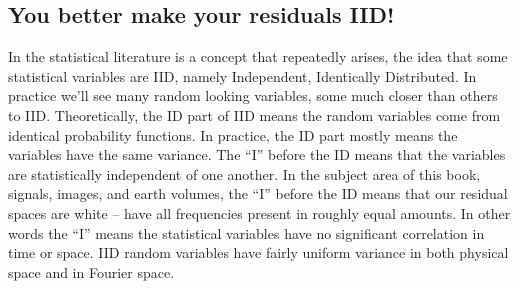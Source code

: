 \subsection{You better make your residuals IID!}
In the statistical literature is a concept that repeatedly arises,
the idea that some statistical variables are IID, namely Independent, Identically Distributed.
In practice we'll see many random looking variables,
some much closer than others to IID.
Theoretically, the ID part of IID means the random variables come from identical
probability functions.
In practice, the ID part mostly means the variables have the same variance.
The ``I'' before the ID means that the variables are statistically independent of one another.
In the subject area of this book, signals, images, and earth volumes,
the ``I'' before the ID means that our residual spaces are white --
have all frequencies present in roughly equal amounts.
In other words the ``I'' means the statistical variables
have no significant correlation in time or space.
IID random variables have fairly uniform variance in both physical space and in Fourier space.

